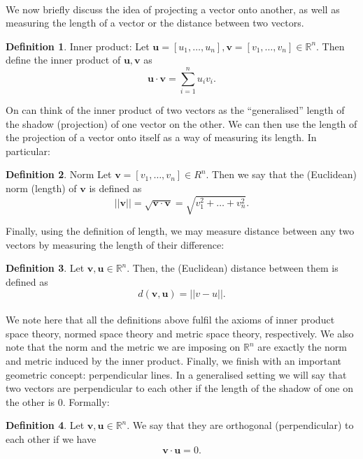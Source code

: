 \documentclass{article}
\theoremstyle{definition}
\newtheorem{definition}{Definition}[section]
\theoremstyle{example}
\newcommand{\Reals}{\mathbb{R}}
\renewcommand{\vec}[1]{\mathbf{#1}}
\newcommand{\norm}[1]{||#1||}
\begin{document}
\paragraph{} We now briefly discuss the idea of projecting a vector onto
another, as well as measuring the length of a vector or the distance between two
vectors.
\begin{definition}{Inner product:}
  Let $\vec{u} = [u_1, \hdots, u_n], \vec{v} = [v_1, \hdots, v_n] \in \Reals^n$.
  Then define the inner product of $\vec{u}, \vec{v}$ as
  \[
    \vec{u} \cdot \vec{v} = \sum_{i = 1}^n u_iv_i.
  \]
\end{definition}
On can think of the inner product of two vectors as the ``generalised'' length
of the shadow (projection) of one vector on the other.
We can then use the length of the projection of a vector onto itself as a way of
measuring its length. In particular:
\begin{definition}{Norm}
  Let $\vec{v} = [v_1, \hdots, v_n] \in R^n$. Then we say that the (Euclidean) norm (length) of
  $\vec{v}$ is defined as
  \[
    \norm{\vec{v}} = \sqrt{\vec{v} \cdot \vec{v}} = \sqrt{v_1^2 + \hdots + v_n^2}.
  \]
\end{definition}
Finally, using the definition of length, we may measure distance between any two
vectors by measuring the length of their difference:
\begin{definition}
  Let $\vec{v}, \vec{u} \in \Reals^n$. Then, the (Euclidean) distance between
  them is defined as
  \[
    d(\vec{v}, \vec{u}) = \norm{v - u}.
  \]
\end{definition}
\paragraph{} We note here that all the definitions above fulfil the axioms of
inner product space theory, normed space theory and metric space theory,
respectively. We also note that the norm and the metric we are imposing on
$\Reals^n$ are exactly the norm and metric induced by the inner product.
Finally, we finish with an important geometric concept: perpendicular lines.
In a generalised setting we will say that two vectors are perpendicular to each
other if the length of the shadow of one on the other is $0$. Formally:
\begin{definition}
  Let $\vec{v}, \vec{u} \in \Reals^n$. We say that they are orthogonal
  (perpendicular) to each other if we have
  \[
    \vec{v} \cdot \vec{u} = 0.
  \]
\end{definition}
\end{document}
